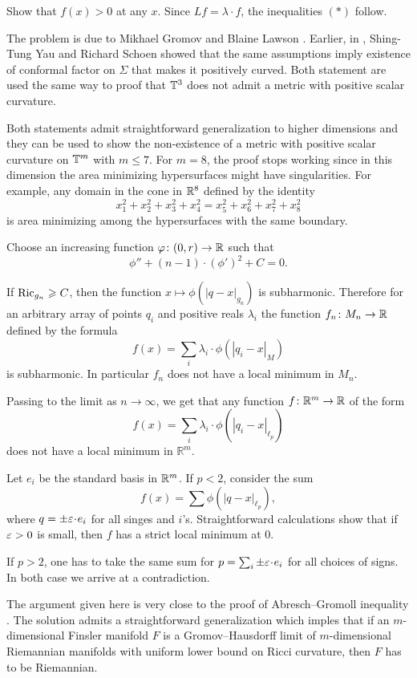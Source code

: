 Show that $f(x)>0$ at any $x$.
Since $Lf=\lambda\cdot f$, the inequalities $({*})$ follow.\qeds


The problem is due to Mikhael Gromov and Blaine Lawson \cite{gromov-lawson}.
Earlier, in \cite{schoen-yau}, Shing-Tung  Yau and Richard Schoen showed that the same assumptions 
imply existence of conformal factor on $\Sigma$ that makes it positively curved.
Both statement are used the same way
to proof that $\mathbb{T}^3$ does not admit a metric with positive scalar curvature.

Both statements admit straightforward generalization to higher dimensions
and they can be used to show the non-existence of a metric with positive scalar curvature on $\mathbb{T}^m$ with $m\le 7$.
For $m=8$, the proof stops working 
since in this dimension the area minimizing hypersurfaces might have singularities.
For example, 
any domain in the cone in $\mathbb{R}^8$
defined by the identity
\[x^2_1+x^2_2+x^2_3+x^2_4=x^2_5+x^2_6+x^2_7+x^2_8\]
is area minimizing among the hypersurfaces with the same boundary.





Choose an increasing function $\varphi\colon(0,r)\to \mathbb{R}$
such that 
\[\phi''+(n-1)\cdot(\phi')^2+C=0.\]

If $\operatorname{\rm Ric}_{g_n}\geqslant C$, 
then the function 
$x\mapsto\phi(|q-x|_{g_n})$ is subharmonic.
Therefore for an arbitrary array of points $q_i$ 
and positive reals $\lambda_i$ the function $f_n\colon M_n\to \mathbb{R}$
defined by the formula
$$f(x)=\sum_i\lambda_i\cdot\phi(|q_i-x|_M)$$
is subharmonic.
In particular $f_n$ does not have a local minimum in $M_n$.

Passing to the limit as $n\to \infty$, we get that any function $f\:\mathbb{R}^m\z\to\mathbb{R}$
of the form 
$$f(x)=\sum_i\lambda_i\cdot\phi(|q_i-x|_{\ell_p})$$
does not have a local minimum in $\mathbb{R}^m$.

Let $e_i$ be the standard basis in $\mathbb{R}^m$. 
If $p<2$, consider the sum 
$$f(x)=\sum\phi(|q-x|_{\ell_p}),$$
where $q=\pm\eps\cdot e_i$ for all singes and $i$'s.
Straightforward calculations show that if $\varepsilon>0$ is small, then $f$
has a strict local minimum at $0$.

If $p>2$, one has to take the same sum for  $p=\sum_i\pm\eps\cdot e_i$ for all choices of signs.
In both case we arrive at a contradiction.
\qeds

The argument given here is very close to the proof of Abresch--Gromoll inequality \cite{abresch-gromoll}.
The solution admits a straightforward generalization which imples that if an $m$-dimensional  Finsler manifold $F$ is a Gromov--Hausdorff limit of $m$-dimensional Riemannian manifolds with uniform lower bound on Ricci curvature, then $F$ has to be Riemannian.

